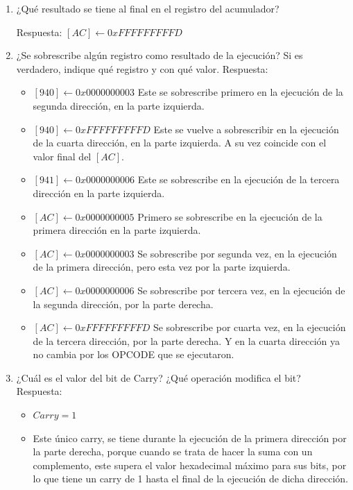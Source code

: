 \documentclass{article}
\begin{document}
\begin{enumerate}
\item ¿Qué resultado se tiene al final en el registro del acumulador?

Respuesta:
\([AC] \leftarrow 0xFFFFFFFFFD\)

\item ¿Se sobrescribe algún registro como resultado de la ejecución? Si
es verdadero, indique qué registro y con qué valor.
Respuesta:
\begin{itemize}
\item \([940] \leftarrow 0x0000000003\)
Este se sobrescribe primero en la ejecución de la segunda
dirección, en la parte izquierda.
\item \([940] \leftarrow 0xFFFFFFFFFD\)
Este se vuelve a sobrescribir en la ejecución de la cuarta
dirección, en la parte izquierda. A su vez coincide con el valor
final del \([AC]\).
\item \([941] \leftarrow 0x0000000006\)
Este se sobrescribe en la ejecución de la tercera dirección en la
parte izquierda.
\item \([AC] \leftarrow 0x0000000005\)
Primero se sobrescribe en la ejecución de la primera dirección en
la parte izquierda.
\item \([AC] \leftarrow 0x0000000003\)
Se sobrescribe por segunda vez, en la ejecución de la primera
dirección, pero esta vez por la parte izquierda.
\item \([AC] \leftarrow 0x0000000006\)
Se sobrescribe por tercera vez, en la ejecución de la segunda
dirección, por la parte derecha.
\item \([AC] \leftarrow 0xFFFFFFFFFD\)
Se sobrescribe por cuarta vez, en la ejecución de la tercera
dirección, por la parte derecha. Y en la cuarta dirección ya no
cambia por los OPCODE que se ejecutaron.
\end{itemize}

\item ¿Cuál es el valor del bit de Carry? ¿Qué operación modifica el bit?
Respuesta:
\begin{itemize}
\item \(Carry = 1\)

\item Este único carry, se tiene durante la ejecución de la primera
dirección por la parte derecha, porque cuando se trata de hacer
la suma con un complemento, este supera el valor hexadecimal
máximo para sus bits, por lo que tiene un carry de 1 hasta el
final de la ejecución de dicha dirección.
\end{itemize}
\end{enumerate}
\end{document}
